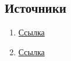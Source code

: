 \documentclass[a4paper,12pt]{article} %
\begin{document}
\begin{center}
    \section{Источники}
\end{center}
\begin{enumerate}
    \item \href{https://ru.wikipedia.org/wiki/LaTeX#:~:text=LaTeX%20(%D0%BF%D1%80%D0%BE%D0%B8%D0%B7%D0%BD%D0%BE%D1%81%D0%B8%D1%82%D1%81%D1%8F%20%2F%CB%88l%C9%91%CB%90,LA%CE%A4%CE%95%CE%A7.}{Ссылка}
    \item \href{https://www.opennet.ru/docs/RUS/linux_base/node380.html}{Ссылка}
\end{enumerate}
\end{document}
